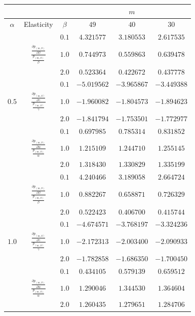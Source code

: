 \documentclass[10pt,A4paper]{article}
\begin{document}
\begin{table}[h]
\centering
\begin{tabular}{|c|c|c|c|c|c|}
\hline
& &  &  & $m$ & \\
\hline
$\alpha$ & Elasticity & $\beta$ & $49$ & $40$ & $30$ \\
\hline
 & & $0.1$ & $4.321577$ & $3.180553$ & $2.617535$ \\
\cline{3-6}
 & $\frac{\frac{\partial  p_{(m,S)}}{\partial \beta}}{\frac{p_{(m,S)}}{\beta}}$ & $1.0$ & $0.744973$ & $0.559863$ & $0.639478$ \\
\cline{3-6}
  & & $2.0$ & $0.523364$ & $0.422672$ & $0.437778$ \\
\cline{2-6}
 & & $0.1$ & $-5.019562$ & $-3.965867$ & $-3.449388$ \\
\cline{3-6}
$0.5$ & $\frac{\frac{\partial  p_{(m,S)}}{\partial \gamma}}{\frac{p_{(m,S)}}{\gamma}}$ & $1.0$ & $-1.960082$ & $-1.804573$ & $-1.894623$ \\
\cline{3-6}
 &  & $2.0$ & $-1.841794$ & $-1.753501$ & $-1.772977$ \\
\cline{2-6}
 & & $0.1$ & $0.697985$ & $0.785314$ & $0.831852$ \\
\cline{3-6}
 & $\frac{\frac{\partial  p_{(m,S)}}{\partial \alpha}}{\frac{p_{(m,S)}}{\alpha}}$ & $1.0$ & $1.215109$ & $1.244710$ & $1.255145$ \\
\cline{3-6}
 & & $2.0$ & $1.318430$ & $1.330829$ & $1.335199$ \\
\hline
 & & $0.1$ & $4.240466$ & $3.189058$ & $2.664724$ \\
\cline{3-6}
 & $\frac{\frac{\partial  p_{(m,S)}}{\partial \beta}}{\frac{p_{(m,S)}}{\beta}}$ & $1.0$ & $0.882267$ & $0.658871$ & $0.726329$ \\
\cline{3-6}
  & & $2.0$ & $0.522423$ & $0.406700$ & $0.415744$ \\
\cline{2-6}
 & & $0.1$ & $-4.674571$ & $-3.768197$ & $-3.324236$ \\
\cline{3-6}
$1.0$ & $\frac{\frac{\partial  p_{(m,S)}}{\partial \gamma}}{\frac{p_{(m,S)}}{\gamma}}$ & $1.0$ & $-2.172313$ & $-2.003400$ & $-2.090933$ \\
\cline{3-6}
 &  & $2.0$ & $-1.782858$ & $-1.686350$ & $-1.700450$ \\
\cline{2-6}
 & & $0.1$ & $0.434105$ & $0.579139$ & $0.659512$ \\
\cline{3-6}
 & $\frac{\frac{\partial  p_{(m,S)}}{\partial \alpha}}{\frac{p_{(m,S)}}{\alpha}}$ & $1.0$ & $1.290046$ & $1.344530$ & $1.364604$ \\
\cline{3-6}
 & & $2.0$ & $1.260435$ & $1.279651$ & $1.284706$ \\

\end{tabular}
\end{table}
\end{document}
